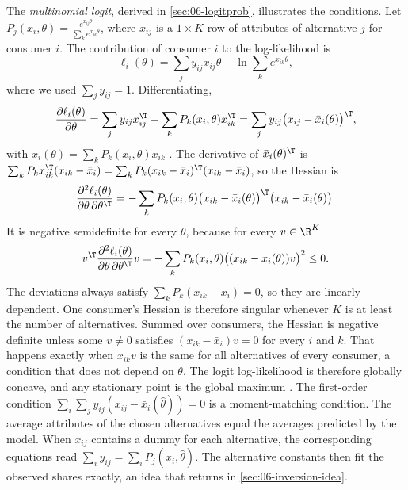 The \emph{multinomial logit}, derived in \cref{sec:06-logitprob}, illustrates the conditions. Let $P_j(x_i, \theta) = \frac{e^{x_{ij}\theta}}{\sum_k e^{x_{ik}\theta}}$,
where $x_{ij}$ is a $1\times K$ row of attributes of alternative $j$ for consumer $i$. The contribution of
consumer $i$ to the log-likelihood is
\begin{equation*}
\ell_i(\theta) = \sum_j y_{ij}x_{ij}\theta - \ln\sum_k e^{x_{ik}\theta},
\end{equation*}
where we used $\sum_j y_{ij} = 1$. Differentiating,
\begin{equation}\label{eq:06-score}
\frac{\partial \ell_i(\theta)}{\partial \theta}
= \sum_j y_{ij}x_{ij}^\T - \sum_k P_k(x_i, \theta)x_{ik}^\T
= \sum_j y_{ij}\big(x_{ij} - \bar x_i(\theta)\big)^\T,
\end{equation}
with $\bar x_i(\theta) = \sum_k P_k(x_i, \theta)x_{ik}$ \citep[eq.~3.11, p.~1409]{McFadden1984}. The
derivative of $\bar x_i(\theta)^\T$ is
$\sum_k P_k x_{ik}^\T(x_{ik} - \bar x_i)= \sum_k P_k(x_{ik} - \bar x_i)^\T(x_{ik} - \bar x_i)$, so the Hessian is
\begin{equation}\label{eq:06-hessian}
\frac{\partial^2 \ell_i(\theta)}{\partial\theta\,\partial\theta^\T}
= -\sum_k P_k(x_i, \theta)\big(x_{ik} - \bar x_i(\theta)\big)^\T\big(x_{ik} - \bar x_i(\theta)\big).
\end{equation}
It is negative semidefinite for every $\theta$, because for every $v \in \R^K$
\begin{equation*}
v^\T\frac{\partial^2 \ell_i(\theta)}{\partial\theta\,\partial\theta^\T}v
= -\sum_k P_k(x_i, \theta)\big((x_{ik} - \bar x_i(\theta))v\big)^2 \le 0 .
\end{equation*}
The deviations always satisfy $\sum_k P_k(x_{ik} - \bar x_i) = 0$, so they are linearly dependent. One consumer's
Hessian is therefore singular whenever $K$ is at least the number of alternatives. Summed over consumers, the Hessian is
negative definite unless some $v \ne 0$ satisfies $(x_{ik} - \bar x_i)v = 0$ for every $i$ and $k$. That happens
exactly when $x_{ik}v$ is the same for all alternatives of every consumer, a condition that does not depend on
$\theta$. The logit log-likelihood is therefore globally concave, and any
stationary point is the global maximum \citep[pp.~1409 and 1413]{McFadden1984}. The first-order condition
$\sum_i \sum_j y_{ij}(x_{ij} - \bar x_i(\hat\theta)) = 0$ is a moment-matching condition. The average attributes
of the chosen alternatives equal the averages predicted by the model. When $x_{ij}$ contains a dummy for each
alternative, the corresponding equations read $\sum_i y_{ij} = \sum_i P_j(x_i, \hat\theta)$. The alternative
constants then fit the observed shares exactly, an idea that returns in \cref{sec:06-inversion-idea}.

